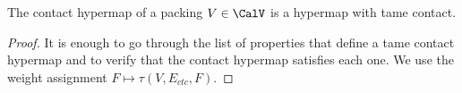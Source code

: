 
\begin{theorem} The contact hypermap of a 
  packing $V\in \CalV$ is a hypermap with tame contact.
\end{theorem}
%
%
%
%

\begin{proof} It is enough to go through the list of properties that
  define a tame contact hypermap and to verify that the contact
  hypermap satisfies each one.  We use the weight assignment $F\mapsto
  \tau(V,E_{ctc},F)$.


\end{proof}
